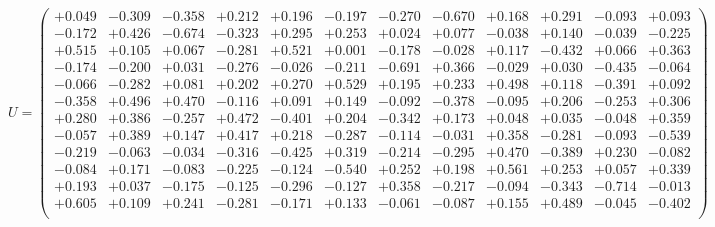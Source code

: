\documentclass[9pt]{article}
\theoremstyle{plain}
\theoremstyle{definition}
\theoremstyle{remark}
\numberwithin{equation}{section}
\begin{document}
$U = \left(
\begin{array}{
cccccccccccc}
+0.049 & -0.309 & -0.358 & +0.212 & +0.196 & -0.197 & -0.270 & -0.670 & +0.168 & +0.291 & -0.093 & +0.093 \\
-0.172 & +0.426 & -0.674 & -0.323 & +0.295 & +0.253 & +0.024 & +0.077 & -0.038 & +0.140 & -0.039 & -0.225 \\
+0.515 & +0.105 & +0.067 & -0.281 & +0.521 & +0.001 & -0.178 & -0.028 & +0.117 & -0.432 & +0.066 & +0.363 \\
-0.174 & -0.200 & +0.031 & -0.276 & -0.026 & -0.211 & -0.691 & +0.366 & -0.029 & +0.030 & -0.435 & -0.064 \\
-0.066 & -0.282 & +0.081 & +0.202 & +0.270 & +0.529 & +0.195 & +0.233 & +0.498 & +0.118 & -0.391 & +0.092 \\
-0.358 & +0.496 & +0.470 & -0.116 & +0.091 & +0.149 & -0.092 & -0.378 & -0.095 & +0.206 & -0.253 & +0.306 \\
+0.280 & +0.386 & -0.257 & +0.472 & -0.401 & +0.204 & -0.342 & +0.173 & +0.048 & +0.035 & -0.048 & +0.359 \\
-0.057 & +0.389 & +0.147 & +0.417 & +0.218 & -0.287 & -0.114 & -0.031 & +0.358 & -0.281 & -0.093 & -0.539 \\
-0.219 & -0.063 & -0.034 & -0.316 & -0.425 & +0.319 & -0.214 & -0.295 & +0.470 & -0.389 & +0.230 & -0.082 \\
-0.084 & +0.171 & -0.083 & -0.225 & -0.124 & -0.540 & +0.252 & +0.198 & +0.561 & +0.253 & +0.057 & +0.339 \\
+0.193 & +0.037 & -0.175 & -0.125 & -0.296 & -0.127 & +0.358 & -0.217 & -0.094 & -0.343 & -0.714 & -0.013 \\
+0.605 & +0.109 & +0.241 & -0.281 & -0.171 & +0.133 & -0.061 & -0.087 & +0.155 & +0.489 & -0.045 & -0.402 \\
\end{array}
\right)$ \newline 
\end{document}
